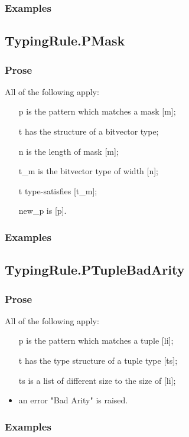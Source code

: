 \documentclass{book}
\begin{document}
    \subsubsection{Examples}

\subsection{TypingRule.PMask}

    \subsubsection{Prose}
    All of the following apply:
   \begin{itemize}
   \item [p] is the pattern which matches a mask [m];
   \item [t] has the structure of a bitvector type;
   \item [n] is the length of mask [m];
   \item [t\_m] is the bitvector type of width [n];
   \item [t] type-satisfies [t\_m];
   \item [new\_p] is [p].
   \end{itemize}

    \subsubsection{Examples}

\subsection{TypingRule.PTupleBadArity}

    \subsubsection{Prose}
    All of the following apply:
   \begin{itemize}
   \item [p] is the pattern which matches a tuple [li];
   \item [t] has the type structure of a tuple type [ts];
   \item [ts] is a list of different size to the size of [li];
   \item an error "Bad Arity" is raised. 
   \end{itemize}

    \subsubsection{Examples}
\end{document}
